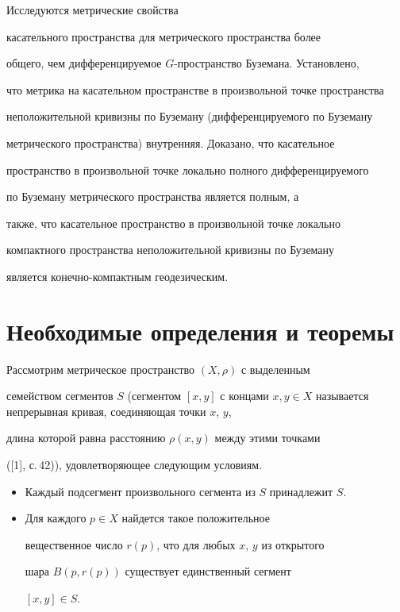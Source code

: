 \label{begin}








Исследуются метрические свойства


касательного пространства для метрического пространства более


общего, чем дифференцируемое $G$-пространство Буземана. Установлено,


что метрика на касательном пространстве в произвольной точке пространства


неположительной кривизны по Буземану (дифференцируемого по Буземану


метрического пространства) внутренняя. Доказано, что касательное


пространство в произвольной точке локально полного дифференцируемого


по Буземану метрического пространства является полным, а


также, что касательное пространство в произвольной точке локально


компактного пространства неположительной  кривизны по Буземану


является конечно-компактным геодезическим.








\section{Необходимые определения и теоремы}





Рассмотрим метрическое пространство $(X,\rho)$ с выделенным


семейством сегментов $S$ (сегментом $[x, y]$ с концами $x, y \in


X$ называется непрерывная кривая, соединяющая точки $x$, $y$,


длина которой равна расстоянию $\rho(x,y)$ между этими точками


([1], с.\,42)), удовлетворяющее следующим условиям.


\begin{itemize}


\item[A.] Каждый подсегмент произвольного сегмента из $S$ принадлежит $S$.


\item[B.] Для каждого $p \in X$ найдется такое положительное


вещественное число $r(p)$, что для любых $x$, $y$ из открытого


шара $B(p, r(p))$ существует единственный сегмент


$[x, y] \in S$.


\end{itemize}





